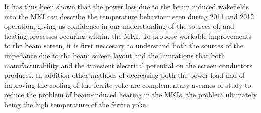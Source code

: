 It has thus been shown that the power loss due to the beam induced wakefields into the MKI can describe the temperature behaviour seen during 2011 and 2012 operation, giving us confidence in our understanding of the sources of, and heating processes occuring within, the MKI. To propose workable improvements to the beam screen, it is first neccesary to understand both the sources of the impedance due to the beam screen layout and the limitations that both manufacturability and the transient electrical potential on the screen conductors produces. In addition other methods of decreasing both the power load and of improving the cooling of the ferrite yoke are complementary avenues of study to reduce the problem of beam-induced heating in the MKIs, the problem ultimately being the high temperature of the ferrite yoke.

